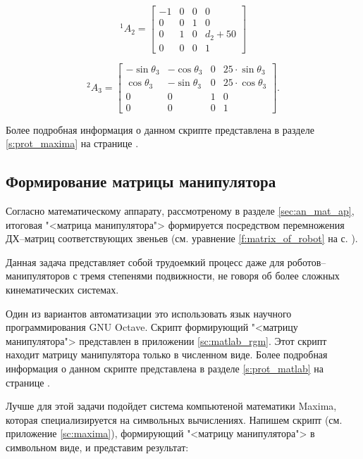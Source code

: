 \documentclass[oneside, final, 14pt]{extarticle}
\begin{document}
\begin{displaymath}
  {}^1A_2 = 
  \begin{bmatrix}
    -1 & 0 & 0 & 0 \\
	0 & 0 & 1 & 0 \\
	0 & 1 & 0 & d_2+50 \\
	0 & 0 & 0 & 1
  \end{bmatrix}
\end{displaymath}

\begin{displaymath}
  {}^2A_3 = 
  \begin{bmatrix}
    -\sin{\theta_3} & -\cos{\theta_3} & 0 & 25 \cdot \sin{\theta_3} \\
	\cos{\theta_3} & -\sin{\theta_3} & 0 & 25 \cdot \cos{\theta_3} \\
	0 & 0 & 1 & 0 \\
	0 & 0 & 0 & 1
  \end{bmatrix}
  .
\end{displaymath}
\par
Более подробная информация о данном скрипте представлена в разделе \ref{s:prot_maxima} на странице \pageref{s:prot_maxima}.

\subsection{Формирование матрицы манипулятора}

Согласно математическому аппарату, рассмотреному в разделе \ref{sec:an_mat_ap}, итоговая "<матрица манипулятора"> формируется посредством перемножения ДХ--матриц соответствующих звеньев (см. уравнение \ref{f:matrix_of_robot} на с. \pageref{f:matrix_of_robot}).
\par
Данная задача представляет собой трудоемкий процесс даже для роботов--манипуляторов с тремя степенями подвижности, не говоря об более сложных кинематических системах.
\par
Один из вариантов автоматизации это использовать язык научного программирования GNU Octave.
Скрипт формирующий "<матрицу манипулятора"> представлен в приложении \ref{sc:matlab_rgm}.
Этот скрипт находит матрицу манипулятора только в численном виде.
Более подробная информация о данном скрипте представлена в разделе \ref{s:prot_matlab} на странице \pageref{s:prot_matlab}.
\par
Лучше для этой задачи подойдет система компьютеной математики Maxima, которая специализируется на символьных вычислениях.
Напишем скрипт (см. приложение \ref{sc:maxima}), формирующий "<матрицу манипулятора"> в символьном виде, и представим результат:
\end{document}
